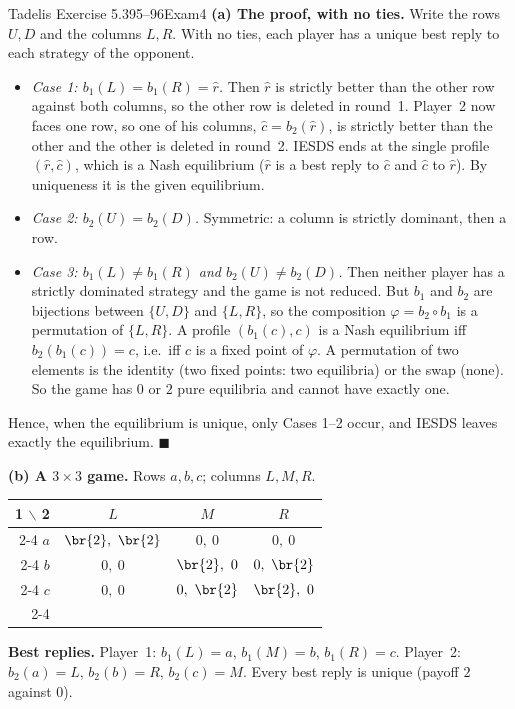 \begin{exsol}{Tadelis Exercise 5.3}{95--96}{Exam}{4}
\solution
\textbf{(a) The proof, with no ties.} Write the rows $U, D$ and the columns $L, R$. With no ties, each
player has a unique best reply to each strategy of the opponent.
\begin{itemize}
  \item \emph{Case 1: $b_1(L) = b_1(R) = \hat r$.} Then $\hat r$ is strictly better than the other row against both
  columns, so the other row is deleted in round~1. Player~2 now faces one row, so one of his
  columns, $\hat c = b_2(\hat r)$, is strictly better than the other and the other is deleted in round~2. IESDS
  ends at the single profile $(\hat r, \hat c)$, which is a Nash equilibrium ($\hat r$ is a best reply
  to $\hat c$ and $\hat c$ to $\hat r$). By uniqueness it is the given equilibrium.
  \item \emph{Case 2: $b_2(U) = b_2(D)$.} Symmetric: a column is strictly dominant, then a row.
  \item \emph{Case 3: $b_1(L) \ne b_1(R)$ and $b_2(U) \ne b_2(D)$.} Then neither player has a
  strictly dominated strategy and the game is not reduced. But $b_1$ and $b_2$ are bijections between
  $\{U,D\}$ and $\{L,R\}$, so the composition $\varphi = b_2 \circ b_1$ is a permutation of $\{L,R\}$.
  A profile $(b_1(c), c)$ is a Nash equilibrium iff $b_2(b_1(c)) = c$, i.e.\ iff $c$ is a fixed point of
  $\varphi$. A permutation of two elements is the identity (two fixed points: two equilibria) or the
  swap (none). So the game has $0$ or $2$ pure equilibria and cannot have exactly one.
\end{itemize}
Hence, when the equilibrium is unique, only Cases 1--2 occur, and IESDS leaves exactly the
equilibrium. $\blacksquare$

\textbf{(b) A $3\times3$ game.} Rows $a, b, c$; columns $L, M, R$.
\begin{center}
\begin{tabular}{r|c|c|c|}
\multicolumn{1}{r}{1 $\backslash$ 2} & \multicolumn{1}{c}{$L$} & \multicolumn{1}{c}{$M$} & \multicolumn{1}{c}{$R$}\\ \cline{2-4}
$a$ & $\br{2},\ \br{2}$ & $0,\ 0$ & $0,\ 0$ \\ \cline{2-4}
$b$ & $0,\ 0$ & $\br{2},\ 0$ & $0,\ \br{2}$ \\ \cline{2-4}
$c$ & $0,\ 0$ & $0,\ \br{2}$ & $\br{2},\ 0$ \\ \cline{2-4}
\end{tabular}
\end{center}
\textbf{Best replies.} Player~1: $b_1(L) = a$, $b_1(M) = b$, $b_1(R) = c$. Player~2: $b_2(a) = L$,
$b_2(b) = R$, $b_2(c) = M$. Every best reply is unique (payoff $2$ against $0$).


\end{exsol}

